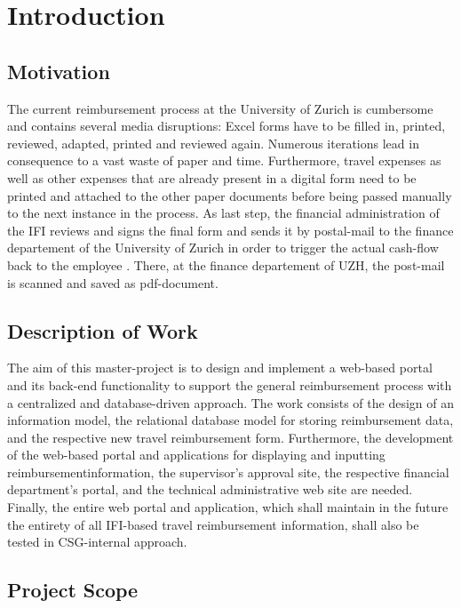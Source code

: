 \chapter{Introduction}

\section{Motivation}

The current reimbursement process at the University of Zurich is cumbersome and contains several media disruptions: Excel forms have to be filled in, printed, reviewed, adapted, printed and reviewed again. Numerous iterations lead in consequence to a vast waste of paper and time. Furthermore, travel expenses as well as other expenses that are already present in a digital form need to be printed and attached to the other paper documents before being passed manually to the next instance in the process. As last step, the financial administration of the IFI reviews and signs the final form and sends it by postal-mail to the finance departement of the University of Zurich in order to trigger the actual cash-flow back to the employee \cite{ifi}. There, at the finance departement of UZH, the post-mail is scanned and saved as pdf-document.

\section{Description of Work}

The aim of this master-project is to design and implement a web-based portal and its back-end functionality to support the general reimbursement process with a centralized and database-driven approach. The work consists of the design of an information model, the relational database model for storing reimbursement data, and the respective new travel reimbursement form. Furthermore, the development of the web-based portal and applications for displaying and inputting reimbursementinformation, the supervisor’s approval site, the respective financial department’s portal, and the technical administrative web site are needed. Finally, the entire web portal and application, which shall maintain in the future the entirety of all IFI-based travel reimbursement information, shall also be tested in CSG-internal approach.


\section{Project Scope}

